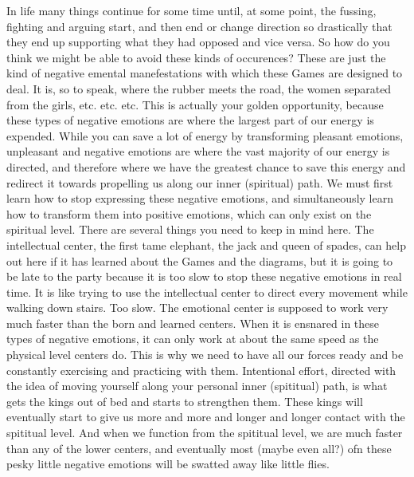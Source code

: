 \documentclass[12pt,letterpaper]{book}
\begin{document}
In life many things continue for some time until, at some point, the fussing, fighting and arguing start, and then end or change direction so drastically that they end up supporting what they had opposed and vice versa. So how do you think we might be able to avoid these kinds of occurences? These are just the kind of negative emental manefestations with which these Games are designed to deal. It is, so to speak, where the rubber meets the road, the women separated from the girls, etc. etc. etc. This is actually your golden opportunity, because these types of negative emotions are where the largest part of our energy is expended. While you can save a lot of energy by transforming pleasant emotions, unpleasant and negative emotions are where the vast majority of our energy is directed, and therefore where we have the greatest chance to save this energy and redirect it towards propelling us along our inner (spiritual) path. We must first learn how to stop expressing these negative emotions, and simultaneously learn how to transform them into positive emotions, which can only exist on the spiritual level. There are several things you need to keep in mind here. The intellectual center, the first tame elephant, the jack and queen of spades, can help out here if it has learned about the Games and the diagrams, but it is going to be late to the party because it is too slow to stop these negative emotions in real time. It is like trying to use the intellectual center to direct every movement while walking down stairs. Too slow. The emotional center is supposed to work very much faster than the born and learned centers. When it is ensnared in these types of negative emotions, it can only work at about the same speed as the physical level centers do. This is why we need to have all our forces ready and be constantly exercising and practicing with them. Intentional effort, directed with the idea of moving yourself along your personal inner (spititual) path, is what gets the kings out of bed and starts to strengthen them. These kings will eventually start to give us more and more and longer and longer contact with the spititual level. And when we function from the spititual level, we are much faster than any of the lower centers, and eventually most (maybe even all?) ofn these pesky little negative emotions will be swatted away like little flies.
\end{document}
